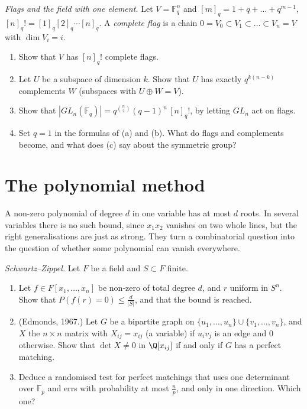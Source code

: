 \begin{exercise}[$\star$]\label{pb:flags}
\emph{Flags and the field with one element.} Let $V=\mathbb F_q^n$ and $[m]_q=1+q+\dots+q^{m-1}$, $[n]_q!=[1]_q[2]_q\cdots[n]_q$.
A \emph{complete flag} is a chain $0=V_0\subset V_1\subset\dots\subset V_n=V$ with $\dim V_i=i$.
\begin{enumerate}[label=(\alph*)]
\item Show that $V$ has $[n]_q!$ complete flags.
\item Let $U$ be a subspace of dimension $k$. Show that $U$ has exactly $q^{k(n-k)}$ complements $W$ (subspaces with $U\oplus W=V$).
\item Show that $|GL_n(\mathbb F_q)|=q^{\binom n2}(q-1)^n\,[n]_q!$, by letting $GL_n$ act on flags.
\item Set $q=1$ in the formulas of (a) and (b). What do flags and complements become, and what does (c) say about the
symmetric group?
\end{enumerate}
\end{exercise}

\section{The polynomial method}

A non-zero polynomial of degree $d$ in one variable has at most $d$ roots. In several variables there is no such bound, since
$x_1x_2$ vanishes on two whole lines, but the right generalisations are just as strong. They turn a combinatorial question into
the question of whether some polynomial can vanish everywhere.

\begin{exercise}[$\star$]\label{pb:schwartz}
\emph{Schwartz--Zippel.} Let $F$ be a field and $S\subset F$ finite.
\begin{enumerate}[label=(\alph*)]
\item Let $f\in F[x_1,\dots,x_n]$ be non-zero of total degree $d$, and $r$ uniform in $S^n$. Show that $P(f(r)=0)\le\frac d{|S|}$,
and that the bound is reached.
\item (Edmonds, 1967.) Let $G$ be a bipartite graph on $\{u_1,\dots,u_n\}\cup\{v_1,\dots,v_n\}$, and $X$ the $n\times n$ matrix with
$X_{ij}=x_{ij}$ (a variable) if $u_iv_j$ is an edge and $0$ otherwise. Show that $\det X\ne0$ in $\Q[x_{ij}]$ if and only if $G$ has
a perfect matching.
\item Deduce a randomised test for perfect matchings that uses one determinant over $\mathbb F_p$ and errs with probability at
most $\frac np$, and only in one direction. Which one?
\end{enumerate}
\end{exercise}


